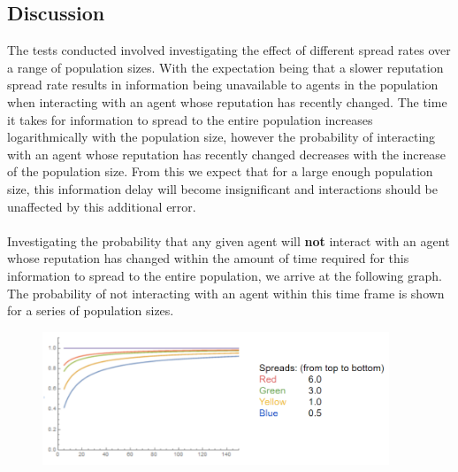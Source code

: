 \documentclass[10pt,a4paper]{article}
\begin{document}
\subsection{Discussion}
The tests conducted involved investigating the effect of different spread rates over a range of population sizes.
With the expectation being that a slower reputation spread rate results in information being unavailable to agents in the population when interacting with an agent whose reputation has recently changed.
The time it takes for information to spread to the entire population increases logarithmically with the population size, however the probability of interacting with an agent whose reputation has recently changed decreases with the increase of the population size.
From this we expect that for a large enough population size, this information delay will become insignificant and interactions should be unaffected by this additional error.
\\\\
Investigating the probability that any given agent will \textbf{not} interact with an agent whose reputation has changed within the amount of time required for this information to spread to the entire population, we arrive at the following graph.
The probability of not interacting with an agent within this time frame is shown for a series of population sizes.
\begin{figure}[h!]
\begin{center}
  \includegraphics[width=28em]{probability_of_interaction.png}
\end{center}
  \label{fig:ProbabilityComms}
\end{figure}
\end{document}

